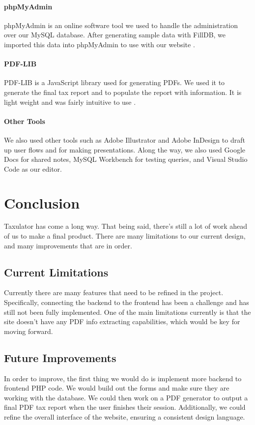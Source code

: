 \documentclass[sigconf]{acmart}
\begin{document}
\paragraph{phpMyAdmin}
phpMyAdmin is an online software tool we used to handle the administration over our MySQL database. After generating sample data with FillDB, we imported this data into phpMyAdmin to use with our website \cite{phpMyAdmin}.

\paragraph{PDF-LIB}
PDF-LIB is a JavaScript library used for generating PDFs. We used it to generate the final tax report and to populate the report with information. It is light weight and was fairly intuitive to use \cite{PDF-LIB}.

\paragraph{Other Tools}
We also used other tools such as Adobe Illustrator \cite{Illustrator} and Adobe InDesign \cite{InDesign} to draft up user flows and for making presentations. Along the way, we also used Google Docs \cite{GDocs} for shared notes, MySQL Workbench \cite{Workbench} for testing queries, and Visual Studio Code \cite{VSCode} as our editor.

\section{Conclusion}
Taxulator has come a long way. That being said, there’s still a lot of work ahead of us to make a final product. There are many limitations to our current design, and many improvements that are in order.

\subsection{Current Limitations}
Currently there are many features that need to be refined in the project. Specifically, connecting the backend to the frontend has been a challenge and has still not been fully implemented. One of the main limitations currently is that the site doesn't have any PDF info extracting capabilities, which would be key for moving forward.

\subsection{Future Improvements}
In order to improve, the first thing we would do is implement more backend to frontend PHP code. We would build out the forms and make sure they are working with the database. We could then work on a PDF generator to output a final PDF tax report when the user finishes their session. Additionally, we could refine the overall interface of the website, ensuring a consistent design language.
\end{document}

